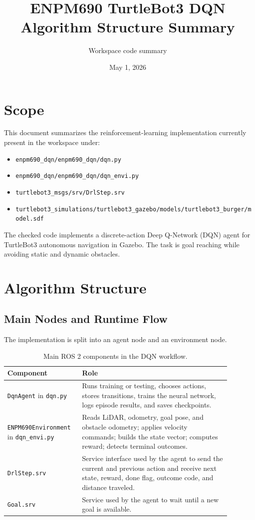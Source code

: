 \documentclass[11pt,a4paper]{article}
\title{ENPM690 TurtleBot3 DQN Algorithm Structure Summary}
\author{Workspace code summary}
\date{May 1, 2026}
\begin{document}
\maketitle

\section{Scope}

This document summarizes the reinforcement-learning implementation currently present in the workspace under:
\begin{itemize}[noitemsep]
    \item \texttt{enpm690\_dqn/enpm690\_dqn/dqn.py}
    \item \texttt{enpm690\_dqn/enpm690\_dqn/dqn\_envi.py}
    \item \texttt{turtlebot3\_msgs/srv/DrlStep.srv}
    \item \texttt{turtlebot3\_simulations/turtlebot3\_gazebo/models/turtlebot3\_burger/model.sdf}
\end{itemize}

The checked code implements a discrete-action Deep Q-Network (DQN) agent for TurtleBot3 autonomous navigation in Gazebo. The task is goal reaching while avoiding static and dynamic obstacles.

\section{Algorithm Structure}

\subsection{Main Nodes and Runtime Flow}

The implementation is split into an agent node and an environment node.

\begin{table}[h]
\centering
\begin{tabular}{p{0.28\linewidth} p{0.62\linewidth}}
\toprule
\textbf{Component} & \textbf{Role} \\
\midrule
\texttt{DqnAgent} in \texttt{dqn.py} & Runs training or testing, chooses actions, stores transitions, trains the neural network, logs episode results, and saves checkpoints. \\
\texttt{ENPM690Environment} in \texttt{dqn\_envi.py} & Reads LiDAR, odometry, goal pose, and obstacle odometry; applies velocity commands; builds the state vector; computes reward; detects terminal outcomes. \\
\texttt{DrlStep.srv} & Service interface used by the agent to send the current and previous action and receive next state, reward, done flag, outcome code, and distance traveled. \\
\texttt{Goal.srv} & Service used by the agent to wait until a new goal is available. \\
\bottomrule
\end{tabular}
\caption{Main ROS 2 components in the DQN workflow.}
\end{table}
\end{document}
